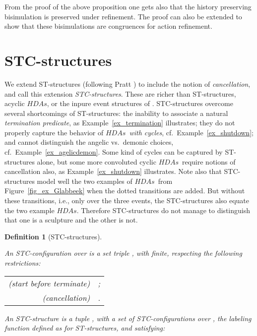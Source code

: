 \documentclass[submission,copyright,creativecommons]{eptcs}
\newtheorem{proposition}[theorem]{Proposition}
\newtheorem{definition}[theorem]{Definition}
\newcommand{\cp}[1]{}
\newcommand\HDAs{\ensuremath{\mathit{HDAs}}}
\begin{document}
From the proof of the above proposition one gets also that the history preserving bisimulation is preserved under refinement. The proof can also be extended to show that these bisimulations are congruences for action refinement.


\cp{
\begin{proposition}
ST-trace equivalence and cc-equivalence are preserved under action refinement.
\end{proposition}

\begin{proposition}
Action refinement for higher dimensional automata is defined by replacing transitions by new \HDAs. This result should be deducible from the refinement on adjacent-closed ST-structures.
\end{proposition}
}


\section{STC-structures}\label{sec_STCstruct}


We extend ST-structures (following Pratt \cite{Pratt03trans_cancel}) to include the notion of \textit{cancellation}, and call this extension \textit{STC-structures}. These are richer than ST-structures, acyclic \HDAs, or the inpure event structures of \cite{GlabbeekP09configStruct}. 
STC-structures overcome several shortcomings of ST-structures: the inability to associate a natural \textit{termination predicate}, as Example~\ref{ex_termination} illustrates;  they do not properly capture the behavior of \textit{\HDAs\ with cycles}, cf.~Example~\ref{ex_shutdown}; and cannot distinguish the angelic vs.\ demonic choices, cf.~Example~\ref{ex_agelicdemon}. Some kind of cycles can be captured by ST-structures alone, but some more convoluted cyclic \HDAs\ require notions of cancellation also, as Example~\ref{ex_shutdown} illustrates. 
Note also that STC-structures model well the two examples of \HDAs\ from Figure~\ref{fig_ex_Glabbeek} when the dotted transitions are added. But without these transitions, i.e., only over the three events, the STC-structures also equate the two example \HDAs. Therefore STC-structures do not manage to distinguish that one is a sculpture and the other is not.

\begin{definition}[STC-structures]\label{def_STCstructures}\ 

An \emph{STC-configuration} over  is a set triple , with  finite, respecting the following restrictions:
\begin{center}
\begin{tabular}{rl}
(start before terminate) & ;\\
(cancellation) & .\\
\end{tabular} 
\end{center}
An \emph{STC-structure} is a tuple , with  a set of \emph{STC-configurations} over , the labeling function  defined as for ST-structures, and satisfying:

\end{definition}
\end{document}
